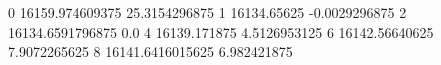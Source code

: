0 16159.974609375 25.3154296875
1 16134.65625 -0.0029296875
2 16134.6591796875 0.0
4 16139.171875 4.5126953125
6 16142.56640625 7.9072265625
8 16141.6416015625 6.982421875

